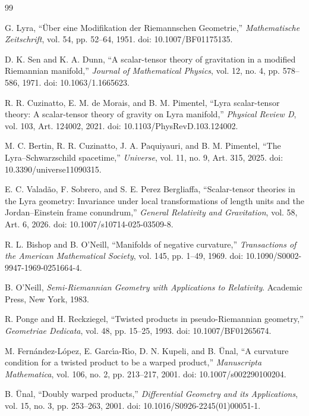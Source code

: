 \documentclass[a4paper,11pt]{article}
\theoremstyle{plain}
\numberwithin{equation}{section}
\begin{document}
\begin{thebibliography}{99}
	
	G. Lyra,
	``\"{U}ber eine Modifikation der Riemannschen Geometrie,''
	\emph{Mathematische Zeitschrift},
	vol. 54, pp. 52--64, 1951.
	doi: 10.1007/BF01175135.
	
	D. K. Sen and K. A. Dunn,
	``A scalar-tensor theory of gravitation in a modified Riemannian
	manifold,''
	\emph{Journal of Mathematical Physics},
	vol. 12, no. 4, pp. 578--586, 1971.
	doi: 10.1063/1.1665623.
	
	R. R. Cuzinatto, E. M. de Morais, and B. M. Pimentel,
	``Lyra scalar-tensor theory: A scalar-tensor theory of gravity on
	Lyra manifold,''
	\emph{Physical Review D},
	vol. 103, Art. 124002, 2021.
	doi: 10.1103/PhysRevD.103.124002.
	
	M. C. Bertin, R. R. Cuzinatto, J. A. Paquiyauri, and B. M. Pimentel,
	``The Lyra--Schwarzschild spacetime,''
	\emph{Universe},
	vol. 11, no. 9, Art. 315, 2025.
	doi: 10.3390/universe11090315.
	
	E. C. Valad\~{a}o, F. Sobrero, and S. E. Perez Bergliaffa,
	``Scalar-tensor theories in the Lyra geometry: Invariance under local
	transformations of length units and the Jordan--Einstein frame
	conundrum,''
	\emph{General Relativity and Gravitation},
	vol. 58, Art. 6, 2026.
	doi: 10.1007/s10714-025-03509-8.
	
	R. L. Bishop and B. O'Neill,
	``Manifolds of negative curvature,''
	\emph{Transactions of the American Mathematical Society},
	vol. 145, pp. 1--49, 1969.
	doi: 10.1090/S0002-9947-1969-0251664-4.
	
	B. O'Neill,
	\emph{Semi-Riemannian Geometry with Applications to Relativity}.
	Academic Press, New York, 1983.
	
	R. Ponge and H. Reckziegel,
	``Twisted products in pseudo-Riemannian geometry,''
	\emph{Geometriae Dedicata},
	vol. 48, pp. 15--25, 1993.
	doi: 10.1007/BF01265674.
	
	M. Fern\'{a}ndez-L\'{o}pez, E. Garc\'{\i}a-R\'{\i}o,
	D. N. Kupeli, and B. \"{U}nal,
	``A curvature condition for a twisted product to be a warped product,''
	\emph{Manuscripta Mathematica},
	vol. 106, no. 2, pp. 213--217, 2001.
	doi: 10.1007/s002290100204.
	
	B. \"{U}nal,
	``Doubly warped products,''
	\emph{Differential Geometry and its Applications},
	vol. 15, no. 3, pp. 253--263, 2001.
	doi: 10.1016/S0926-2245(01)00051-1.
	

\end{thebibliography}
\end{document}
